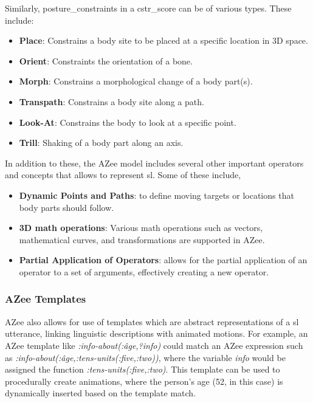 \documentclass[../../main.tex]{subfiles}
\begin{document}
Similarly, \gls{posture_constraint}s in a \gls{cstr_score} can be of various types. These include:

\begin{itemize}
  \item \textbf{Place}: Constrains a body \gls{site} to be placed at a specific location in 3D space.
  \item \textbf{Orient}: Constraints the orientation of a bone.
  \item \textbf{Morph}: Constrains a morphological change of a body part(s).
  \item \textbf{Transpath}: Constrains a body \gls{site} along a path.
  \item \textbf{Look-At}: Constrains the body to look at a specific point.
  \item \textbf{Trill}: Shaking of a body part along an axis.
\end{itemize}

In addition to these, the AZee model includes several other important operators and concepts that allows to represent \gls{sl}. Some of these include,

\begin{itemize}
  \item \textbf{Dynamic Points and Paths}: to define moving targets or locations that body parts should follow.
  \item \textbf{3D math operations}: Various math operations such as vectors, mathematical curves, and transformations are supported in AZee.
  \item \textbf{Partial Application of Operators}: allows for the partial application of an operator to a set of arguments, effectively creating a new operator.
\end{itemize}

\subsubsection{AZee Templates}
\label{ch:background_work:sign_language_descriptions:azee:templates}

AZee also allows for use of templates which are abstract representations of a \gls{sl} utterance, linking linguistic descriptions with animated motions. For example, an AZee template like \emph{:info-about(:âge,?info)} could match an AZee expression such as \emph{:info-about(:âge,:tens-units(:five,:two))}, where the variable \emph{info} would be assigned the function \emph{:tens-units(:five,:two)}. This template can be used to procedurally create animations, where the person's age (52, in this case) is dynamically inserted based on the template match.
\end{document}
